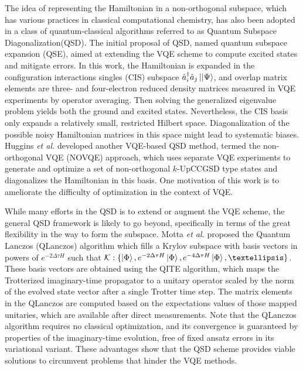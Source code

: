 \documentclass[journal=jctcce,manuscript=article]{achemso}
\newcommand{\familyname}[0]{Quantum Subspace Diagonalization\xspace}
\begin{document}
The idea of representing the Hamiltonian in a non-orthogonal subspace,\cite{ostlund1982modern} which has various practices in classical computational chemistry,\cite{Lowdin:1950tq,King:1967ev,Noodleman:1981iz,Voter:1981eu,Malmqvist:1986jh,Koch:1993tf,thom2009hartree,sundstrom2014non} has also been adopted in a class of quantum-classical algorithms referred to as \familyname (QSD).\cite{McClean:2017ct,Colless:2018hp,Motta:2019bu, Parrish:2019tc,Huggins:2019vv,Ollitrault:2019tn,Takeshita:2020dh}
The initial proposal of QSD, named quantum subspace expansion (QSE), aimed at extending the VQE scheme to compute excited states and mitigate errors.\cite{McClean:2017ct} 
In this work, the Hamiltonian is expanded in the configuration interactions singles (CIS) subspace $\hat{a}_{i}^{\dagger} \hat{a}_{j}\left\vert{|\Psi}\right\rangle$, and overlap matrix elements are three- and four-electron reduced density matrices measured in VQE experiments by operator averaging.\cite{Takeshita:2020dh} Then solving the generalized eigenvalue problem yields both the ground and excited states. Nevertheless, the CIS basis only expands a relatively small, restricted Hilbert space. Diagonalization of the possible noisy Hamiltonian matrices in this space might lead to systematic biases.\cite{Blunt:2018ee}
Huggins \textit{et al.} developed another VQE-based QSD method, termed the non-orthogonal VQE (NOVQE) approach,\cite{Huggins:2019vv} which uses separate VQE experiments to generate and optimize a set of non-orthogonal $k$-UpCCGSD type states\cite{Lee:2018cy} and diagonalizes the Hamiltonian in this basis. One motivation of this work is to ameliorate the difficulty of optimization in the context of VQE.

While many efforts in the QSD is to extend or augment the VQE scheme, the general QSD framework is likely to go beyond, specifically in terms of the great flexibility in the way to form the subspace. 
Motta \textit{et al.} proposed the Quantum Lanczos (QLanczos) algorithm\cite{Motta:2019bu} which fills a Krylov subspace with basis vectors in powers of $e^{-2\Delta \tau H}$ such that $\mathcal{K}: \{\ket{\Phi}, e^{-2 \Delta \tau H}\ket{\Phi}, e^{-4  \Delta \tau H}\ket{\Phi},…  \}$. These basis vectors are obtained using the QITE algorithm,\cite{Motta:2019bu} which maps the Trotterized\cite{Trotter:1959wh} imaginary-time propagator to a unitary operator scaled by the norm of the evolved state vector after a single Trotter time step. The matrix elements in the QLanczos are computed based on the expectations values of those mapped unitaries, which are available after direct measurements. Note that the QLanczos algorithm requires no classical optimization, and its convergence is guaranteed by properties of the imaginary-time evolution, free of fixed ansatz errors in its variational variant.\cite{McArdle:2019ek} These advantages show that the QSD scheme provides viable solutions to circumvent problems that hinder the VQE methods. 
\end{document}
